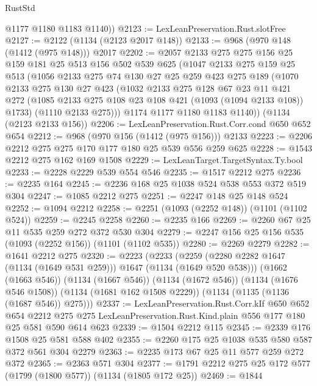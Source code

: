 \begin{lexlean}{RustStd}
\begin{coremodule}
        @1177
        @1180
        @1183
        @1140))
@2123 := LexLeanPreservation.Rust.slotFree
@2127 := @2122 (@1134 (@2123 @2017 @148))
@2133 := @968 (@970 @148 (@1412 (@975 @148))) @2017
@2202 := @2057
    @2133
    @275
    @275
    @156
    @25
    @159
    @181
    @25
    @513
    @156
    @502
    @539
    @625
    (@1047
      @2133
      @275
      @159
      @25
      @513
      (@1056
        @2133
        @275
        @74
        @130
        @27
        @25
        @259
        @423
        @275
        @189
        (@1070
          @2133
          @275
          @130
          @27
          @423
          (@1032
            @2133
            @275
            @128
            @67
            @23
            @11
            @421
            @272
            (@1085 @2133 @275 @108 @23 @108 @421 (@1093 (@1094 @2133 @108)) @1733)
            (@1110 @2133 @275)))
        @1174
        @1177
        @1180
        @1183
        @1140))
    (@1134 (@2123 @2133 @156))
@2206 := LexLeanPreservation.Rust.Corr.cond @650 @652 @654
@2212 := @968 (@970 @156 (@1412 (@975 @156))) @2133
@2223 := @2206 @2212 @275 @275 @170 @177 @180 @25 @539 @556 @259 @625
@2228 := @1543 @2212 @275 @162 @169 @1508
@2229 := LexLeanTarget.TargetSyntax.Ty.bool
@2233 := @2228 @2229 @539 @554 @546
@2235 := @1517 @2212 @275
@2236 := @2235 @164
@2245 := @2236 @168 @25 @1038 @524 @538 @553 @372 @519 @304
@2247 := @1085 @2212 @275
@2251 := @2247 @148 @25 @148 @524
@2252 := @1094 @2212
@2258 := @2251 (@1093 (@2252 @148)) (@1101 (@1102 @524))
@2259 := @2245 @2258
@2260 := @2235 @166
@2269 := @2260 @67 @25 @11 @535 @259 @272 @372 @530 @304
@2279 := @2247 @156 @25 @156 @535 (@1093 (@2252 @156)) (@1101 (@1102 @535))
@2280 := @2269 @2279
@2282 := @1641 @2212 @275
@2320 := @2223
    (@2233
      (@2259 (@2280 @2282 @1647 (@1134 (@1649 @531 @259))) @1647 (@1134 (@1649 @520 @538)))
      (@1662 (@1663 @546))
      (@1134 (@1667 @546))
      (@1134 (@1672 @546))
      (@1134 (@1676 @546 @1508))
      (@1134 (@1681 @162 @1508 @2229))
      (@1134 (@1135 (@1136 (@1687 @546)) @275)))
@2337 := LexLeanPreservation.Rust.Corr.kIf
    @650
    @652
    @654
    @2212
    @275
    @275
    LexLeanPreservation.Rust.Kind.plain
    @556
    @177
    @180
    @25
    @581
    @590
    @614
    @623
@2339 := @1504 @2212 @115
@2345 := @2339 @176 @1508 @25 @581 @588 @402
@2355 := @2260 @175 @25 @1038 @535 @580 @587 @372 @561 @304 @2279
@2363 := @2235 @173 @67 @25 @11 @577 @259 @272 @372
@2365 := @2363 @571 @304
@2377 := @1791 @2212 @275 @25 @172 @577 (@1799 (@1800 @577)) (@1134 (@1805 @172 @25))
@2469 := @1844

\end{coremodule}
\end{lexlean}
